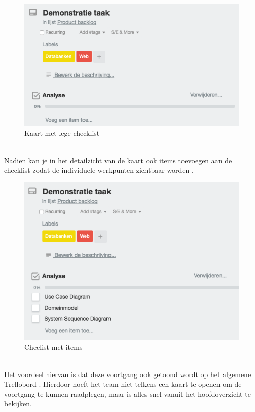 \begin{figure}[H]
	\centering
	\includegraphics[scale=0.5]{./afbeeldingen/nieuwe_checklist.png}
	\caption{Kaart met lege checklist}
	\label{fig:nieuwe_checklist}	
\end{figure} 

\noindent
\\Nadien kan je in het detailzicht van de kaart ook items toevoegen aan de checklist zodat de individuele werkpunten zichtbaar worden .

\begin{figure}[H]
	\centering
	\includegraphics[scale=0.5]{./afbeeldingen/checklist_items.png}
	\caption{Checlist met items}
	\label{fig:checklist_items}	
\end{figure} 

\noindent
\\Het voordeel hiervan is dat deze voortgang ook getoond wordt op het algemene Trellobord . Hierdoor hoeft het team niet telkens een kaart te openen om de voortgang te kunnen raadplegen, maar is alles snel vanuit het hoofdoverzicht te bekijken.


